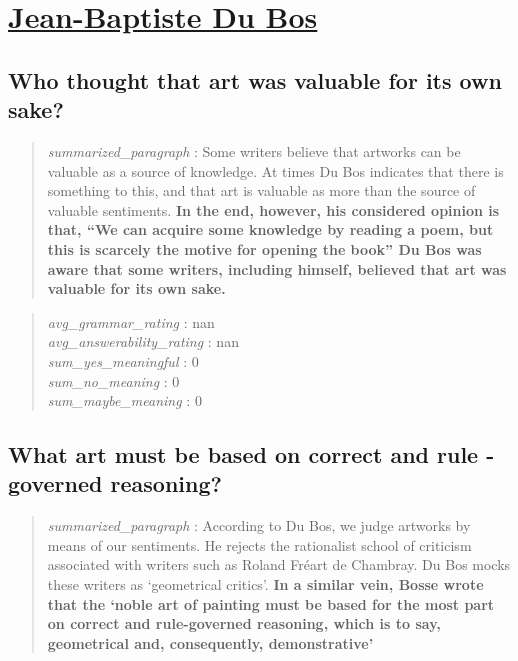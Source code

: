 \hypertarget{jean-baptiste-du-bos}{%
\section{\texorpdfstring{\href{https://plato.stanford.edu/entries/du-bos/index.html}{Jean-Baptiste
Du Bos}}{Jean-Baptiste Du Bos}}\label{jean-baptiste-du-bos}}

\hypertarget{who-thought-that-art-was-valuable-for-its-own-sake}{%
\subsection{Who thought that art was valuable for its own
sake?}\label{who-thought-that-art-was-valuable-for-its-own-sake}}

\begin{quote}
\emph{summarized\_paragraph} : Some writers believe that artworks can be
valuable as a source of knowledge. At times Du Bos indicates that there
is something to this, and that art is valuable as more than the source
of valuable sentiments. \textbf{In the end, however, his considered
opinion is that, ``We can acquire some knowledge by reading a poem, but
this is scarcely the motive for opening the book'' Du Bos was aware that
some writers, including himself, believed that art was valuable for its
own sake.}
\end{quote}

\begin{quote}
\emph{avg\_grammar\_rating} : nan\\
\emph{avg\_answerability\_rating} : nan\\
\emph{sum\_yes\_meaningful} : 0\\
\emph{sum\_no\_meaning} : 0\\
\emph{sum\_maybe\_meaning} : 0
\end{quote}

\hypertarget{what-art-must-be-based-on-correct-and-rule---governed-reasoning}{%
\subsection{What art must be based on correct and rule - governed
reasoning?}\label{what-art-must-be-based-on-correct-and-rule---governed-reasoning}}

\begin{quote}
\emph{summarized\_paragraph} : According to Du Bos, we judge artworks by
means of our sentiments. He rejects the rationalist school of criticism
associated with writers such as Roland Fréart de Chambray. Du Bos mocks
these writers as `geometrical critics'. \textbf{In a similar vein, Bosse
wrote that the `noble art of painting must be based for the most part on
correct and rule-governed reasoning, which is to say, geometrical and,
consequently, demonstrative'}
\end{quote}

